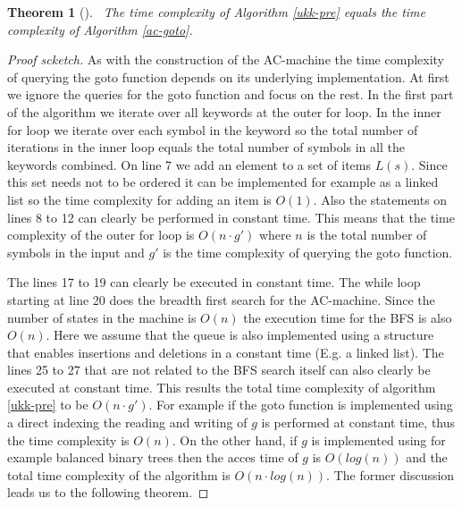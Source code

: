 \documentclass[english,twoside,censored,csm,algorithms-track-2020]{HYthesisML}
\theoremstyle{plain}
\newtheorem{theorem}{Theorem}[chapter]
\theoremstyle{definition}
\begin{document}
\begin{theorem}[]~\label{thm-time-pre}
  The time complexity of Algorithm \ref{ukk-pre} equals the time complexity of
  Algorithm \ref{ac-goto}.
\end{theorem}
\begin{proof}[Proof scketch]
As with the construction of
the AC-machine the time complexity of querying the goto function depends on its underlying
implementation. At first we ignore the queries for the goto function and focus on the rest.
In the first part of the algorithm we iterate over all keywords at the outer for loop. In the
inner for loop we iterate over each symbol in the keyword so the total number of iterations
in the inner loop equals the total number of symbols in all the keywords combined. On line 7
we add an element to a set of items $L(s)$. Since this set needs not to be ordered it can be
implemented for example as a linked list so the time complexity for adding an item is $O(1)$.
Also the statements on lines 8 to 12 can clearly be performed in constant time. This means that
the time complexity of the outer for loop is $O(n\cdot g')$ where $n$ is the total number of
symbols in the input and $g'$ is the time complexity of querying the goto function.

The lines 17 to 19 can clearly be executed in constant time. The while loop starting at line 20
does the breadth first search for the AC-machine. Since the number of states in the machine is
$O(n)$ the execution time for the BFS is also $O(n)$. Here we assume that the queue is also
implemented using a structure that enables insertions and deletions in a constant time (E.g.
a linked list). The lines 25 to 27 that are not related to the BFS search itself can also clearly
be executed at constant time. This results the total time complexity of algorithm \ref{ukk-pre} to be
$O(n\cdot g')$. For example if the goto function is implemented using a direct indexing the
reading and writing of $g$ is performed at constant time, thus the time complexity is $O(n)$.
On the other hand, if $g$ is implemented using for example balanced binary trees then the acces
time of $g$ is $O(log (n))$ and the total time complexity of the algorithm is $O(n\cdot log(n))$.
The former discussion leads us to the following theorem.
\end{proof}
\end{document}
